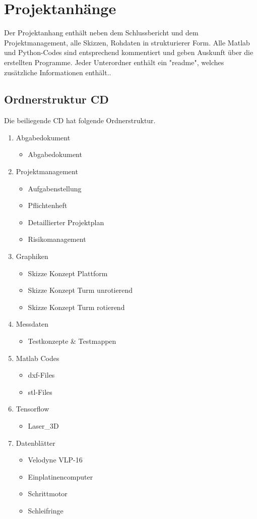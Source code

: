 \appendix

\chapter{Projektanhänge}
\label{Anhang}

Der Projektanhang enthält neben dem Schlussbericht und dem Projektmanagement, alle Skizzen, Rohdaten in strukturierer Form. Alle Matlab und Python-Codes sind entsprechend kommentiert und geben Auskunft über die erstellten Programme. Jeder Unterordner enthält ein "readme", welches zusätzliche Informationen enthält..
\section{Ordnerstruktur CD}

Die beiliegende CD hat folgende Ordnerstruktur.

\begin{enumerate}
	\item Abgabedokument
	\begin{itemize}
		\item Abgabedokument
	\end{itemize}
	\item Projektmanagement
	\begin{itemize}
		\item Aufgabenstellung
		\item Pflichtenheft
		\item Detaillierter Projektplan
		\item Risikomanagement
	\end{itemize}
	\item Graphiken
	\begin{itemize}
		\item Skizze Konzept Plattform
		\item Skizze Konzept Turm unrotierend
		\item Skizze Konzept Turm rotierend
	\end{itemize}
	\item Messdaten
	\begin{itemize}
		\item Testkonzepte & Testmappen
	\end{itemize}
	\item Matlab Codes
	\begin{itemize}
		\item dxf-Files
		\item stl-Files
	\end{itemize}
	\item Tensorflow
	\begin{itemize}
		\item Laser\_3D
	\end{itemize}
	\item Datenblätter
	\begin{itemize}
		\item Velodyne VLP-16
		\item Einplatinencomputer
		\item Schrittmotor
		\item Schleifringe
	\end{itemize}
\end{enumerate}

\newpage



